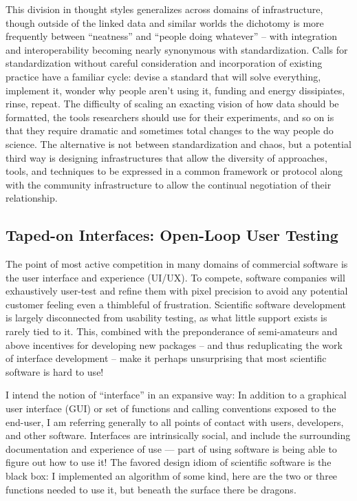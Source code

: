 This division in thought styles generalizes across domains of
infrastructure, though outside of the linked data and similar worlds the
dichotomy is more frequently between ``neatness'' and ``people doing
whatever'' -- with integration and interoperability becoming nearly
synonymous with standardization. Calls for standardization without
careful consideration and incorporation of existing practice have a
familiar cycle: devise a standard that will solve everything, implement
it, wonder why people aren't using it, funding and energy dissipiates,
rinse, repeat. The
difficulty of scaling an exacting vision of how data should be
formatted, the tools researchers should use for their experiments, and
so on is that they require dramatic and sometimes total changes to the
way people do science. The alternative is not between standardization
and chaos, but a potential third way is designing infrastructures that
allow the diversity of approaches, tools, and techniques to be expressed
in a common framework or protocol along with the community
infrastructure to allow the continual negotiation of their relationship.

\hypertarget{taped-on-interfaces-open-loop-user-testing}{%
\subsection{Taped-on Interfaces: Open-Loop User
Testing}\label{taped-on-interfaces-open-loop-user-testing}}

The point of most active competition in many domains of commercial
software is the user interface and experience (UI/UX). To compete,
software companies will exhaustively user-test and refine them with
pixel precision to avoid any potential customer feeling even a
thimbleful of frustration. Scientific software development is largely
disconnected from usability testing, as what little support exists is
rarely tied to it. This, combined with the preponderance of
semi-amateurs and above incentives for developing new packages -- and
thus reduplicating the work of interface development -- make it perhaps
unsurprising that most scientific software is hard to use!

I intend the notion of ``interface'' in an expansive way: In addition to
a graphical user interface (GUI) or set of functions and calling
conventions exposed to the end-user, I am referring generally to all
points of contact with users, developers, and other software. Interfaces
are intrinsically social, and include the surrounding documentation and
experience of use --- part of using software is being able to figure out
how to use it! The favored design idiom of scientific software is the
black box: I implemented an algorithm of some kind, here are the two or
three functions needed to use it, but beneath the surface there be
dragons.

